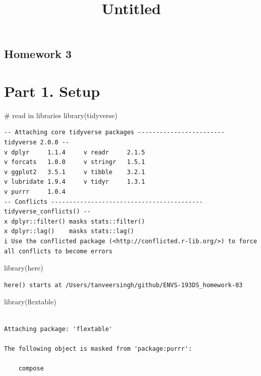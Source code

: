 \documentclass[
  letterpaper,
  DIV=11,
  numbers=noendperiod]{scrartcl}
\title{Untitled}
\author{}
\date{}
\newenvironment{Shaded}{\begin{snugshade}}{\end{snugshade}}
\newcommand{\CommentTok}[1]{\textcolor[rgb]{0.37,0.37,0.37}{#1}}
\newcommand{\FunctionTok}[1]{\textcolor[rgb]{0.28,0.35,0.67}{#1}}
\newcommand{\NormalTok}[1]{\textcolor[rgb]{0.00,0.23,0.31}{#1}}
\begin{document}
\maketitle


\subsection{Homework 3}\label{homework-3}

\section{Part 1. Setup}\label{part-1.-setup}

\begin{Shaded}
\begin{Highlighting}[]
\CommentTok{\# read in libraries}
\FunctionTok{library}\NormalTok{(tidyverse)}
\end{Highlighting}
\end{Shaded}

\begin{verbatim}
-- Attaching core tidyverse packages ------------------------ tidyverse 2.0.0 --
v dplyr     1.1.4     v readr     2.1.5
v forcats   1.0.0     v stringr   1.5.1
v ggplot2   3.5.1     v tibble    3.2.1
v lubridate 1.9.4     v tidyr     1.3.1
v purrr     1.0.4     
-- Conflicts ------------------------------------------ tidyverse_conflicts() --
x dplyr::filter() masks stats::filter()
x dplyr::lag()    masks stats::lag()
i Use the conflicted package (<http://conflicted.r-lib.org/>) to force all conflicts to become errors
\end{verbatim}

\begin{Shaded}
\begin{Highlighting}[]
\FunctionTok{library}\NormalTok{(here)}
\end{Highlighting}
\end{Shaded}

\begin{verbatim}
here() starts at /Users/tanveersingh/github/ENVS-193DS_homework-03
\end{verbatim}

\begin{Shaded}
\begin{Highlighting}[]
\FunctionTok{library}\NormalTok{(flextable)}
\end{Highlighting}
\end{Shaded}

\begin{verbatim}

Attaching package: 'flextable'

The following object is masked from 'package:purrr':

    compose
\end{verbatim}
\end{document}
